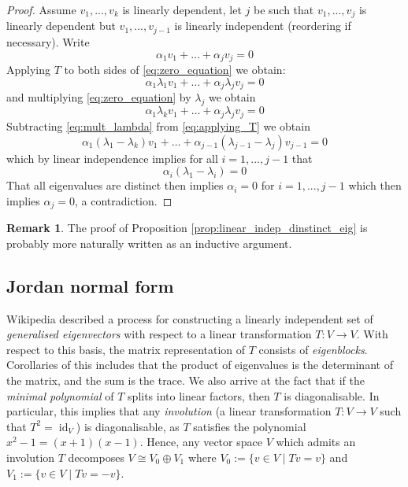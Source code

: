 \documentclass[12pt]{article}
\theoremstyle{plain}
\theoremstyle{definition}
\newtheorem{remark}[thm]{Remark}
\newcommand{\lto}{\longrightarrow}
\begin{document}
\begin{proof}
Assume $v_1,...,v_k$ is linearly dependent, let $j$ be such that $v_1,...,v_{j}$ is linearly dependent but $v_1,...,v_{j-1}$ is linearly independent (reordering if necessary). Write
\begin{equation}\label{eq:zero_equation}
\alpha_1 v_1 + \hdots + \alpha_j v_j = 0
\end{equation}
Applying $T$ to both sides of \eqref{eq:zero_equation} we obtain:
\begin{equation}\label{eq:applying_T}
\alpha_1 \lambda_1 v_1 + \hdots + \alpha_j \lambda_j v_j = 0
\end{equation}
and multiplying \eqref{eq:zero_equation} by $\lambda_j$ we obtain
\begin{equation}\label{eq:mult_lambda}
\alpha_1\lambda_k v_1 + \hdots + \alpha_j \lambda_j v_j = 0
\end{equation}
Subtracting \eqref{eq:mult_lambda} from \eqref{eq:applying_T} we obtain
\begin{equation}
\alpha_1(\lambda_1 - \lambda_k)v_1 + \hdots + \alpha_{j-1}(\lambda_{j - 1} - \lambda_j)v_{j-1} = 0
\end{equation}
which by linear independence implies for all $i = 1,...,j-1$ that
\begin{equation}
\alpha_i(\lambda_1 - \lambda_i) = 0
\end{equation}
That all eigenvalues are distinct then implies $\alpha_i = 0$ for $i = 1,...,j-1$ which then implies $\alpha_j = 0$, a contradiction.
\end{proof}
\begin{remark}
The proof of Proposition \ref{prop:linear_indep_dinstinct_eig} is probably more naturally written as an inductive argument.
\end{remark}
\subsection{Jordan normal form}\label{sec:Jordan_normal_form}
Wikipedia described a process for constructing a linearly independent set of \emph{generalised eigenvectors} with respect to a linear transformation $T: V \lto V$. With respect to this basis, the matrix representation of $T$ consists of \emph{eigenblocks}. Corollaries of this includes that the product of eigenvalues is the determinant of the matrix, and the sum is the trace.  We also arrive at the fact that if the \emph{minimal polynomial} of $T$ splits into linear factors, then $T$ is diagonalisable. In particular, this implies that any \emph{involution} (a linear transformation $T: V \lto V$ such that $T^2 = \operatorname{id}_V$) is diagonalisable, as $T$ satisfies the polynomial $x^2 - 1 = (x+1)(x-1)$. Hence, any vector space $V$ which admits an involution $T$ decomposes $V \cong V_0 \oplus V_1$ where $V_0 := \lbrace v \in V \mid Tv = v\rbrace$ and $V_1 := \lbrace v \in V \mid Tv = -v\rbrace$.
\end{document}
